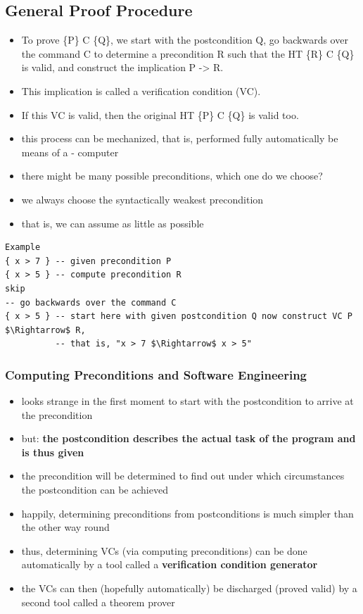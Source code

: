 \clearpage
\hypertarget{general-proof-procedure}{%
\subsection{General Proof Procedure}\label{general-proof-procedure}}

\begin{itemize}
\tightlist
\item
  To prove \{P\} C \{Q\}, we start with the postcondition Q, go
  backwards over the command C to determine a precondition R such that
  the HT \{R\} C \{Q\} is valid, and construct the implication P
  -\textgreater{} R.
\item
  This implication is called a verification condition (VC).
\item
  If this VC is valid, then the original HT \{P\} C \{Q\} is valid too.
\item
  this process can be mechanized, that is, performed fully automatically
  be means of a - computer
\item
  there might be many possible preconditions, which one do we choose?
\item
  we always choose the syntactically weakest precondition
\item
  that is, we can assume as little as possible
\end{itemize}

\begin{lstlisting}
Example
{ x > 7 } -- given precondition P
{ x > 5 } -- compute precondition R
skip  
-- go backwards over the command C
{ x > 5 } -- start here with given postcondition Q now construct VC P $\Rightarrow$ R, 
          -- that is, "x > 7 $\Rightarrow$ x > 5"
\end{lstlisting}

\hypertarget{computing-preconditions-and-software-engineering}{%
\subsubsection{Computing Preconditions and Software
Engineering}\label{computing-preconditions-and-software-engineering}}

\begin{itemize}
\tightlist
\item
  looks strange in the first moment to start with the postcondition to
  arrive at the precondition
\item
  but: \textbf{the postcondition describes the actual task of the
  program and is thus given}
\item
  the precondition will be determined to find out under which
  circumstances the postcondition can be achieved
\item
  happily, determining preconditions from postconditions is much simpler
  than the other way round
\item
  thus, determining VCs (via computing preconditions) can be done
  automatically by a tool called a \textbf{verification condition
  generator}
\item
  the VCs can then (hopefully automatically) be discharged (proved
  valid) by a second tool called a theorem prover
\end{itemize}

